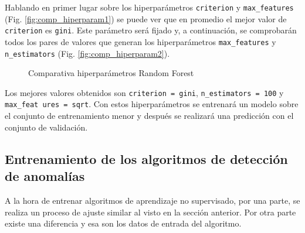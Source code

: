 Hablando en primer lugar sobre los hiperparámetros \texttt{criterion} y \texttt{max\_features} (Fig. \ref{fig:comp_hiperparam1}) se puede ver que en promedio el mejor valor de \texttt{criterion} es \texttt{gini}. Este parámetro será fijado y, a continuación, se comprobarán todos los pares de valores que generan los hiperparámetros \texttt{max\_features} y \texttt{n\_estimators} (Fig. \ref{fig:comp_hiperparam2}).

\begin{figure}
    \centering
    \quad
    \caption{Comparativa hiperparámetros Random Forest}
    \label{fig:comp_hiperparam}
\end{figure}

Los mejores valores obtenidos son \texttt{criterion = gini}, \texttt{n\_estimators = 100} y \texttt{max\_feat ures = sqrt}. Con estos hiperparámetros se entrenará un modelo sobre el conjunto de entrenamiento menor y después se realizará una predicción con el conjunto de validación.


\subsection{Entrenamiento de los algoritmos de detección de anomalías}

A la hora de entrenar algoritmos de aprendizaje no supervisado, por una parte, se realiza un proceso de ajuste similar al visto en la sección anterior. Por otra parte existe una diferencia y esa son los datos de entrada del algoritmo.

